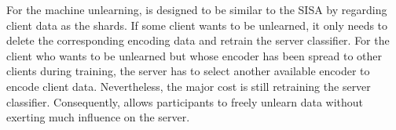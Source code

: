 For the machine unlearning, \Fname is designed to be similar to the SISA by regarding client data as the shards.
If some client wants to be unlearned, it only needs to delete the corresponding encoding data and retrain the server classifier.
For the client who wants to be unlearned but whose encoder has been spread to other clients during training, the server has to select another available encoder to encode client data.
Nevertheless, the major cost is still retraining the server classifier. Consequently,
\Fname allows participants to freely unlearn data without exerting much influence on the server.







